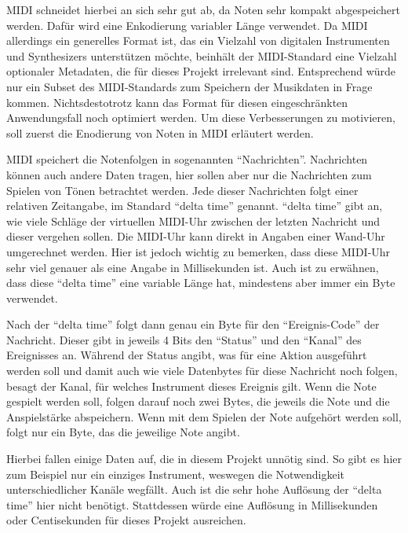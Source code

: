 \ac{MIDI} schneidet hierbei an sich sehr gut ab, da Noten sehr kompakt abgespeichert werden.
Dafür wird eine Enkodierung variabler Länge verwendet.
Da \ac{MIDI} allerdings ein generelles Format ist, das ein Vielzahl von digitalen Instrumenten und Synthesizers unterstützen möchte, beinhält der \ac{MIDI}-Standard eine Vielzahl optionaler Metadaten, die für dieses Projekt irrelevant sind.
Entsprechend würde nur ein Subset des \ac{MIDI}-Standards zum Speichern der Musikdaten in Frage kommen.
Nichtsdestotrotz kann das Format für diesen eingeschränkten Anwendungsfall noch optimiert werden.
Um diese Verbesserungen zu motivieren, soll zuerst die Enodierung von Noten in \ac{MIDI} erläutert werden.

\ac{MIDI} speichert die Notenfolgen in sogenannten \enquote{Nachrichten}.
Nachrichten können auch andere Daten tragen, hier sollen aber nur die Nachrichten zum Spielen von Tönen betrachtet werden.
Jede dieser Nachrichten folgt einer relativen Zeitangabe, im Standard \enquote{delta time} genannt.
\enquote{delta time} gibt an, wie viele Schläge der virtuellen \ac{MIDI}-Uhr zwischen der letzten Nachricht und dieser vergehen sollen.
Die \ac{MIDI}-Uhr kann direkt in Angaben einer Wand-Uhr umgerechnet werden.
Hier ist jedoch wichtig zu bemerken, dass diese \ac{MIDI}-Uhr sehr viel genauer als eine Angabe in Millisekunden ist.
Auch ist zu erwähnen, dass diese \enquote{delta time} eine variable Länge hat, mindestens aber immer ein Byte verwendet.

Nach der \enquote{delta time} folgt dann genau ein Byte für den \enquote{Ereignis-Code} der Nachricht.
Dieser gibt in jeweils 4 Bits den \enquote{Status} und den \enquote{Kanal} des Ereignisses an.
Während der Status angibt, was für eine Aktion ausgeführt werden soll und damit auch wie viele Datenbytes für diese Nachricht noch folgen, besagt der Kanal, für welches Instrument dieses Ereignis gilt.
Wenn die Note gespielt werden soll, folgen darauf noch zwei Bytes, die jeweils die Note und die Anspielstärke abspeichern.
Wenn mit dem Spielen der Note aufgehört werden soll, folgt nur ein Byte, das die jeweilige Note angibt.

Hierbei fallen einige Daten auf, die in diesem Projekt unnötig sind.
So gibt es hier zum Beispiel nur ein einziges Instrument, weswegen die Notwendigkeit unterschiedlicher Kanäle wegfällt.
Auch ist die sehr hohe Auflösung der \enquote{delta time} hier nicht benötigt.
Stattdessen würde eine Auflösung in Millisekunden oder Centisekunden für dieses Projekt ausreichen.

